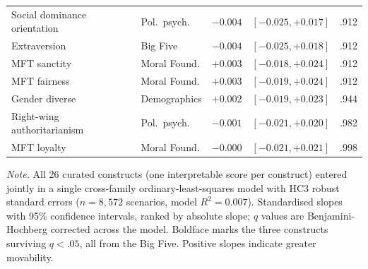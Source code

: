 \documentclass[11pt,a4paper]{article}
\newcommand{\apanote}[1]{\par\vspace{3pt}\begingroup\footnotesize\setstretch{1.06}%
  \textit{Note.} #1\par\endgroup}
\begin{document}
\begin{table}[H]
\begin{tabularx}{\linewidth}{@{}Yp{2.1cm}ccc@{}}
Social dominance orientation & Pol.\ psych. & $-0.004$ & $[-0.025, +0.017]$ & .912 \\
Extraversion & Big Five & $-0.004$ & $[-0.025, +0.018]$ & .912 \\
MFT sanctity & Moral Found. & $+0.003$ & $[-0.018, +0.024]$ & .912 \\
MFT fairness & Moral Found. & $+0.003$ & $[-0.019, +0.024]$ & .912 \\
Gender diverse & Demographics & $+0.002$ & $[-0.019, +0.023]$ & .944 \\
Right-wing authoritarianism & Pol.\ psych. & $-0.001$ & $[-0.021, +0.020]$ & .982 \\
MFT loyalty & Moral Found. & $-0.000$ & $[-0.021, +0.021]$ & .998 \\
\bottomrule
\end{tabularx}
\endgroup
\apanote{All 26 curated constructs (one interpretable score per construct) entered jointly in a
single cross-family ordinary-least-squares model with HC3 robust standard errors ($n = 8{,}572$
scenarios, model $R^2 = 0.007$). Standardised slopes with 95\% confidence intervals, ranked by
absolute slope; $q$ values are Benjamini-Hochberg corrected across the model. Boldface marks the
three constructs surviving $q<.05$, all from the Big Five. Positive slopes indicate greater
movability.}
\end{table}

\clearpage
\end{document}
